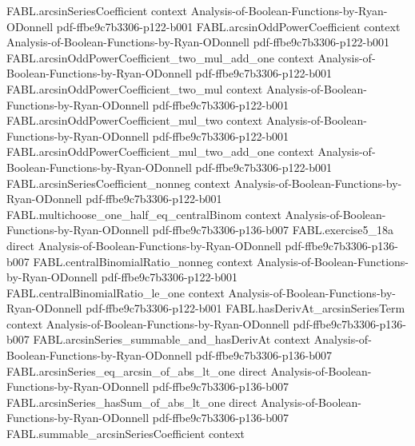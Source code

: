 \begin{theorem}
\label{FABL.exercise5_18}
\leanok
{}
\proofstep
  {FABL.arcsinSeriesCoefficient}
  {context}
  {Analysis-of-Boolean-Functions-by-Ryan-ODonnell}
  {pdf-ffbe9c7b3306-p122-b001}
\proofstep
  {FABL.arcsinOddPowerCoefficient}
  {context}
  {Analysis-of-Boolean-Functions-by-Ryan-ODonnell}
  {pdf-ffbe9c7b3306-p122-b001}
\proofstep
  {FABL.arcsinOddPowerCoefficient_two_mul_add_one}
  {context}
  {Analysis-of-Boolean-Functions-by-Ryan-ODonnell}
  {pdf-ffbe9c7b3306-p122-b001}
\proofstep
  {FABL.arcsinOddPowerCoefficient_two_mul}
  {context}
  {Analysis-of-Boolean-Functions-by-Ryan-ODonnell}
  {pdf-ffbe9c7b3306-p122-b001}
\proofstep
  {FABL.arcsinOddPowerCoefficient_mul_two}
  {context}
  {Analysis-of-Boolean-Functions-by-Ryan-ODonnell}
  {pdf-ffbe9c7b3306-p122-b001}
\proofstep
  {FABL.arcsinOddPowerCoefficient_mul_two_add_one}
  {context}
  {Analysis-of-Boolean-Functions-by-Ryan-ODonnell}
  {pdf-ffbe9c7b3306-p122-b001}
\proofstep
  {FABL.arcsinSeriesCoefficient_nonneg}
  {context}
  {Analysis-of-Boolean-Functions-by-Ryan-ODonnell}
  {pdf-ffbe9c7b3306-p122-b001}
\proofstep
  {FABL.multichoose_one_half_eq_centralBinom}
  {context}
  {Analysis-of-Boolean-Functions-by-Ryan-ODonnell}
  {pdf-ffbe9c7b3306-p136-b007}
\proofstep
  {FABL.exercise5_18a}
  {direct}
  {Analysis-of-Boolean-Functions-by-Ryan-ODonnell}
  {pdf-ffbe9c7b3306-p136-b007}
\proofstep
  {FABL.centralBinomialRatio_nonneg}
  {context}
  {Analysis-of-Boolean-Functions-by-Ryan-ODonnell}
  {pdf-ffbe9c7b3306-p122-b001}
\proofstep
  {FABL.centralBinomialRatio_le_one}
  {context}
  {Analysis-of-Boolean-Functions-by-Ryan-ODonnell}
  {pdf-ffbe9c7b3306-p122-b001}
\proofstep
  {FABL.hasDerivAt_arcsinSeriesTerm}
  {context}
  {Analysis-of-Boolean-Functions-by-Ryan-ODonnell}
  {pdf-ffbe9c7b3306-p136-b007}
\proofstep
  {FABL.arcsinSeries_summable_and_hasDerivAt}
  {context}
  {Analysis-of-Boolean-Functions-by-Ryan-ODonnell}
  {pdf-ffbe9c7b3306-p136-b007}
\proofstep
  {FABL.arcsinSeries_eq_arcsin_of_abs_lt_one}
  {direct}
  {Analysis-of-Boolean-Functions-by-Ryan-ODonnell}
  {pdf-ffbe9c7b3306-p136-b007}
\proofstep
  {FABL.arcsinSeries_hasSum_of_abs_lt_one}
  {direct}
  {Analysis-of-Boolean-Functions-by-Ryan-ODonnell}
  {pdf-ffbe9c7b3306-p136-b007}
\proofstep
  {FABL.summable_arcsinSeriesCoefficient}
  {context}

\end{theorem}
